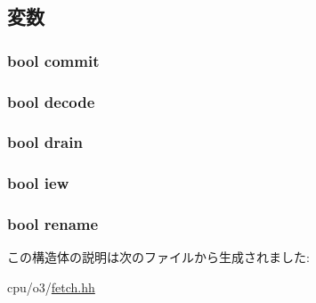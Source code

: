 \subsection{変数}
\hypertarget{structDefaultFetch_1_1Stalls_ad7d6b839c43385b5fffdf2beaff214ec}{
\subsubsection[{commit}]{\setlength{\rightskip}{0pt plus 5cm}bool {\bf commit}}}
\label{structDefaultFetch_1_1Stalls_ad7d6b839c43385b5fffdf2beaff214ec}
\hypertarget{structDefaultFetch_1_1Stalls_a8bd8acc41e5baa0bb18c0f0f6a78020e}{
\subsubsection[{decode}]{\setlength{\rightskip}{0pt plus 5cm}bool {\bf decode}}}
\label{structDefaultFetch_1_1Stalls_a8bd8acc41e5baa0bb18c0f0f6a78020e}
\hypertarget{structDefaultFetch_1_1Stalls_af29f0db645517864849f52e686f40bf6}{
\subsubsection[{drain}]{\setlength{\rightskip}{0pt plus 5cm}bool {\bf drain}}}
\label{structDefaultFetch_1_1Stalls_af29f0db645517864849f52e686f40bf6}
\hypertarget{structDefaultFetch_1_1Stalls_a69f40ab12e9825ce316dfa72651a7404}{
\subsubsection[{iew}]{\setlength{\rightskip}{0pt plus 5cm}bool {\bf iew}}}
\label{structDefaultFetch_1_1Stalls_a69f40ab12e9825ce316dfa72651a7404}
\hypertarget{structDefaultFetch_1_1Stalls_a5e8e124987c56967514ad546a9f9c09b}{
\subsubsection[{rename}]{\setlength{\rightskip}{0pt plus 5cm}bool {\bf rename}}}
\label{structDefaultFetch_1_1Stalls_a5e8e124987c56967514ad546a9f9c09b}


この構造体の説明は次のファイルから生成されました:\begin{DoxyCompactItemize}
\item 
cpu/o3/\hyperlink{fetch_8hh}{fetch.hh}\end{DoxyCompactItemize}
